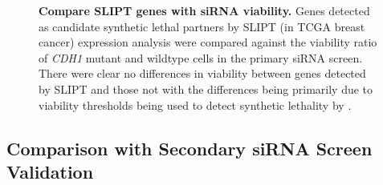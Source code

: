 \begin{figure}[!htp]
\begin{center}
   \end{center}
   \caption[Compare SLIPT genes with siRNA viability]{\small \textbf{Compare \gls{SLIPT} genes with \gls{siRNA} viability.} Genes detected as candidate synthetic lethal partners by \gls{SLIPT} (in TCGA breast cancer) expression analysis were compared against the viability ratio of \textit{CDH1} mutant and wildtype cells in the primary \gls{siRNA} screen. There were clear no differences in viability between genes detected by \gls{SLIPT} and those not with the differences being primarily due to viability thresholds being used to detect synthetic lethality by \citet{Telford2015}. 
}
\label{fig:compare_viability_SL}
\end{figure}

\FloatBarrier

\subsection{Comparison with Secondary siRNA Screen Validation} 

